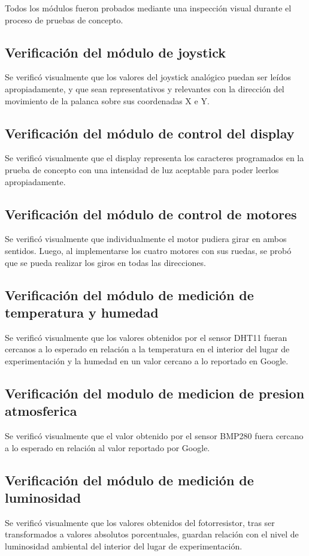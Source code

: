 Todos los módulos fueron probados mediante una inspección visual durante el proceso de pruebas de concepto.


\subsection{Verificación del módulo de joystick}
Se verificó visualmente que los valores del joystick analógico puedan ser leídos apropiadamente, y que sean representativos y relevantes con la dirección del movimiento de la palanca sobre sus coordenadas X e Y.

\subsection{Verificación del módulo de control del display}
Se verificó visualmente que el display representa los caracteres programados en la prueba de concepto con una intensidad de luz aceptable para poder leerlos apropiadamente.


\subsection{Verificación del módulo de control de motores}
Se verificó visualmente que individualmente el motor pudiera girar en ambos sentidos. Luego, al implementarse los cuatro motores con sus ruedas, se probó que se pueda realizar los giros en todas las direcciones.

\subsection{Verificación del módulo de medición de temperatura y humedad}
Se verificó visualmente que los valores obtenidos por el sensor DHT11 fueran cercanos a lo esperado en relación a la temperatura en el interior del lugar de experimentación y la humedad en un valor cercano a lo reportado en Google.

\subsection{Verificación del modulo de medicion de presion atmosferica}
Se verificó visualmente que el valor obtenido por el sensor BMP280 fuera cercano a lo esperado en relación al valor reportado por Google.


\subsection{Verificación del módulo de medición de luminosidad}
Se verificó visualmente que los valores obtenidos del fotorresistor, tras ser transformados a valores absolutos porcentuales, guardan relación con el nivel de luminosidad ambiental del interior del lugar de experimentación.


